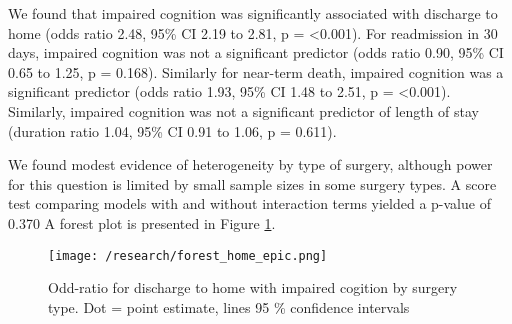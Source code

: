 \documentclass[
]{article}
\begin{document}
We found that impaired cognition was significantly associated with discharge to home (odds ratio 2.48, 95\% CI 2.19 to 2.81, p = \textless0.001).
For readmission in 30 days, impaired cognition was not a significant predictor (odds ratio 0.90, 95\% CI 0.65 to 1.25, p = 0.168).
Similarly for near-term death, impaired cognition was a significant predictor (odds ratio 1.93, 95\% CI 1.48 to 2.51, p = \textless0.001).
Similarly, impaired cognition was not a significant predictor of length of stay (duration ratio 1.04, 95\% CI 0.91 to 1.06, p = 0.611).

We found modest evidence of heterogeneity by type of surgery, although power for this question is limited by small sample sizes in some surgery types. A score test comparing models with and without interaction terms yielded a p-value of 0.370
A forest plot is presented in Figure \ref{fig:fig1}.

\begin{figure}
\centering
\texttt{[image: /research/forest\_home\_epic.png]}
\caption{\label{fig:figone}\label{fig:fig1}Odd-ratio for discharge to home with impaired cogition by surgery type. Dot = point estimate, lines 95 \% confidence intervals}
\end{figure}
\end{document}
